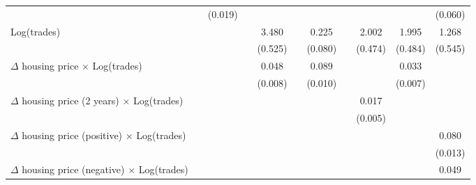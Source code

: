 \documentclass[preview,12pt,varwidth]{standalone}
\begin{document}
\begin{sidewaystable}[htbp]
\begin{tabular}{l*{10}{c}}
                    &                    &     (0.019)        &                    &                    &                    &                    &                    &                    &                    &     (0.060)        \\
[1em]
Log(trades)         &                    &                    &                    &       3.480\sym{**}&                    &       0.225\sym{**}&                    &       2.002\sym{**}&       1.995\sym{**}&       1.268\sym{*} \\
                    &                    &                    &                    &     (0.525)        &                    &     (0.080)        &                    &     (0.474)        &     (0.484)        &     (0.545)        \\
[1em]
$\Delta$ housing price $\times$ Log(trades)&                    &                    &                    &       0.048\sym{**}&                    &       0.089\sym{**}&                    &                    &       0.033\sym{**}&                    \\
                    &                    &                    &                    &     (0.008)        &                    &     (0.010)        &                    &                    &     (0.007)        &                    \\
[1em]
$\Delta$ housing price (2 years) $\times$ Log(trades)&                    &                    &                    &                    &                    &                    &                    &       0.017\sym{**}&                    &                    \\
                    &                    &                    &                    &                    &                    &                    &                    &     (0.005)        &                    &                    \\
[1em]
$\Delta$ housing price (positive) $\times$ Log(trades)&                    &                    &                    &                    &                    &                    &                    &                    &                    &       0.080\sym{**}\\
                    &                    &                    &                    &                    &                    &                    &                    &                    &                    &     (0.013)        \\
[1em]
$\Delta$ housing price (negative) $\times$ Log(trades)&                    &                    &                    &                    &                    &                    &                    &                    &                    &       0.049\sym{*} \\

\end{tabular}
\end{sidewaystable}
\end{document}
